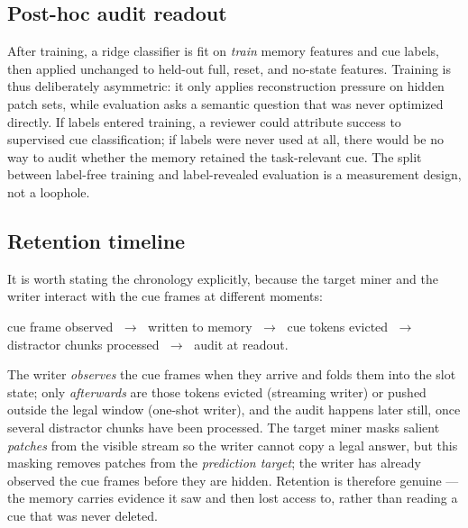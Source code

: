 \subsection{Post-hoc audit readout}
After training, a ridge classifier is fit on \emph{train} memory features and
cue labels, then applied unchanged to held-out full, reset, and no-state
features.  Training is thus deliberately asymmetric: it only applies
reconstruction pressure on hidden patch sets, while evaluation asks a semantic
question that was never optimized directly.  If labels entered training, a
reviewer could attribute success to supervised cue classification; if labels
were never used at all, there would be no way to audit whether the memory
retained the task-relevant cue.  The split between label-free training and
label-revealed evaluation is a measurement design, not a loophole.

\subsection{Retention timeline}
\label{sec:timeline}
It is worth stating the chronology explicitly, because the target miner and the
writer interact with the cue frames at different moments:
\begin{center}\small
cue frame observed $\;\to\;$ written to memory $\;\to\;$ cue tokens evicted
$\;\to\;$ distractor chunks processed $\;\to\;$ audit at readout.
\end{center}
The writer \emph{observes} the cue frames when they arrive and folds them into
the slot state; only \emph{afterwards} are those tokens evicted (streaming
writer) or pushed outside the legal window (one-shot writer), and the audit
happens later still, once several distractor chunks have been processed.  The
target miner masks salient \emph{patches} from the visible stream so the writer
cannot copy a legal answer, but this masking removes patches from the
\emph{prediction target}; the writer has already observed the cue frames before
they are hidden.  Retention is therefore genuine --- the memory carries evidence
it saw and then lost access to, rather than reading a cue that was never
deleted.

